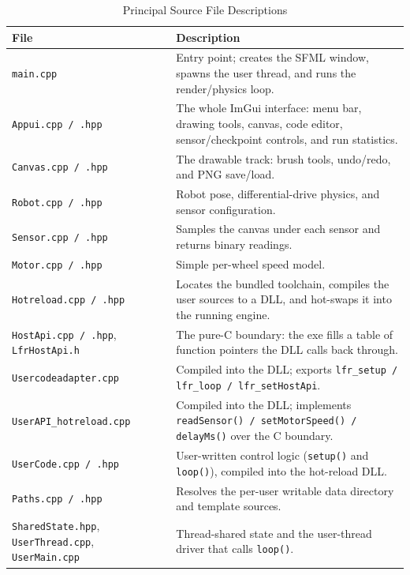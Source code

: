 \begin{table}[htbp]
\centering
\caption{Principal Source File Descriptions}
\label{tab:files}
\renewcommand{\arraystretch}{1.25}
\begin{tabular}{|p{4.8cm}|p{9.2cm}|}
\hline
\textbf{File} & \textbf{Description} \\ \hline
\texttt{main.cpp}            & Entry point; creates the SFML window, spawns the user thread, and runs the render/physics loop. \\ \hline
\texttt{Appui.cpp / .hpp}    & The whole ImGui interface: menu bar, drawing tools, canvas, code editor, sensor/checkpoint controls, and run statistics. \\ \hline
\texttt{Canvas.cpp / .hpp}   & The drawable track: brush tools, undo/redo, and PNG save/load. \\ \hline
\texttt{Robot.cpp / .hpp}    & Robot pose, differential-drive physics, and sensor configuration. \\ \hline
\texttt{Sensor.cpp / .hpp}   & Samples the canvas under each sensor and returns binary readings. \\ \hline
\texttt{Motor.cpp / .hpp}    & Simple per-wheel speed model. \\ \hline
\texttt{Hotreload.cpp / .hpp}& Locates the bundled toolchain, compiles the user sources to a DLL, and hot-swaps it into the running engine. \\ \hline
\texttt{HostApi.cpp / .hpp}, \texttt{LfrHostApi.h} & The pure-C boundary: the exe fills a table of function pointers the DLL calls back through. \\ \hline
\texttt{Usercodeadapter.cpp} & Compiled into the DLL; exports \texttt{lfr\_setup / lfr\_loop / lfr\_setHostApi}. \\ \hline
\texttt{UserAPI\_hotreload.cpp} & Compiled into the DLL; implements \texttt{readSensor() / setMotorSpeed() / delayMs()} over the C boundary. \\ \hline
\texttt{UserCode.cpp / .hpp} & User-written control logic (\texttt{setup()} and \texttt{loop()}), compiled into the hot-reload DLL. \\ \hline
\texttt{Paths.cpp / .hpp}    & Resolves the per-user writable data directory and template sources. \\ \hline
\texttt{SharedState.hpp}, \texttt{UserThread.cpp}, \texttt{UserMain.cpp} & Thread-shared state and the user-thread driver that calls \texttt{loop()}. \\ \hline
\end{tabular}
\end{table}

